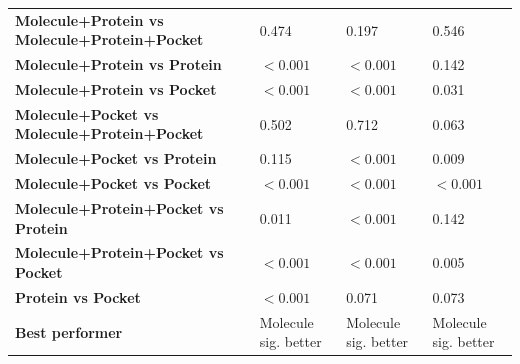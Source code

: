 \begin{table}[H]
{\begin{tabular}{llll}
        \textbf{Molecule+Protein vs Molecule+Protein+Pocket} & 0.474 & 0.197 & 0.546 \\
        \textbf{Molecule+Protein vs Protein} & $< 0.001$ & $< 0.001$ & 0.142 \\
        \textbf{Molecule+Protein vs Pocket} & $< 0.001$ & $< 0.001$ & 0.031 \\
        \textbf{Molecule+Pocket vs Molecule+Protein+Pocket} & 0.502 & 0.712 & 0.063 \\
        \textbf{Molecule+Pocket vs Protein} & 0.115 & $< 0.001$ & 0.009 \\
        \textbf{Molecule+Pocket vs Pocket} & $< 0.001$ & $< 0.001$ & $< 0.001$ \\
        \textbf{Molecule+Protein+Pocket vs Protein} & 0.011 & $< 0.001$ & 0.142 \\
        \textbf{Molecule+Protein+Pocket vs Pocket} & $< 0.001$ & $< 0.001$ & 0.005 \\
        \textbf{Protein vs Pocket} & $< 0.001$ & 0.071 & 0.073 \\
        \textbf{Best performer} & Molecule sig. better & Molecule sig. better & Molecule sig. better \\
        \bottomrule
    \end{tabular}}
\end{table}